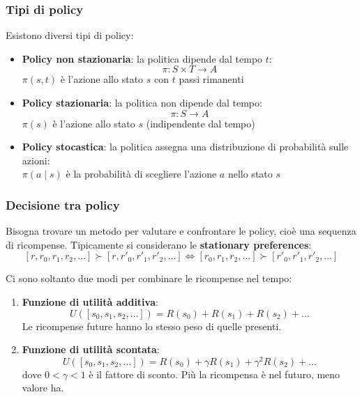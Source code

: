 \documentclass[a4paper]{article}
\begin{document}
\subsubsection{Tipi di policy}
Esistono diversi tipi di policy:
\begin{itemize}
  \item \textbf{Policy non stazionaria}: la politica dipende dal tempo \( t \):
    \[
      \pi : S \times T \to A
    \] 
    \( \pi(s, t) \) è l'azione allo stato \( s \) con \( t \) passi rimanenti

  \item \textbf{Policy stazionaria}: la politica non dipende dal tempo:
    \[
      \pi : S \to A
    \] 
    \( \pi(s) \) è l'azione allo stato \( s \) (indipendente dal tempo)

  \item \textbf{Policy stocastica}: la politica assegna una distribuzione di probabilità
    sulle azioni:\\
    \( \pi(a \;|\; s) \) è la probabilità di scegliere l'azione \( a \) nello stato \( s \)
\end{itemize}

\subsubsection{Decisione tra policy}
Bisogna trovare un metodo per valutare e confrontare le policy, cioè una sequenza di
ricompense. Tipicamente si considerano le \textbf{stationary preferences}:
\[
  \left[ r, r_0, r_1, r_2, \ldots \right] \succ \left[ r, r'_0, r'_1, r'_2, \ldots \right]
  \iff
  \left[ r_0, r_1, r_2, \ldots \right] \succ \left[ r'_0, r'_1, r'_2, \ldots \right]
\] 

\begin{theorem}
  Ci sono soltanto due modi per combinare le ricompense nel tempo:
  \begin{enumerate}
    \item \textbf{Funzione di utilità additiva}:
      \[
        U\left( [s_0, s_1, s_2, \ldots] \right) = R(s_0) + R(s_1) + R(s_2) + \ldots
      \] 
      Le ricompense future hanno lo stesso peso di quelle presenti.

    \item \textbf{Funzione di utilità scontata}:
      \[
        U\left( [s_0, s_1, s_2, \ldots] \right) = R(s_0) + \gamma R(s_1) + \gamma^2 R(s_2) + \ldots
      \] 
      dove \( 0 < \gamma < 1 \) è il fattore di sconto.
      Più la ricompensa è nel futuro, meno valore ha.
  \end{enumerate}
\end{theorem}
\end{document}

